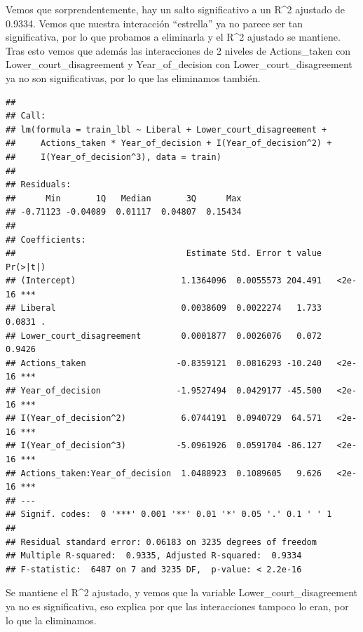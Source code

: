 \documentclass[
]{article}
\begin{document}
Vemos que sorprendentemente, hay un salto significativo a un R\^{}2
ajustado de 0.9334. Vemos que nuestra interacción ``estrella'' ya no
parece ser tan significativa, por lo que probamos a eliminarla y el
R\^{}2 ajustado se mantiene. Tras esto vemos que además las
interacciones de 2 niveles de Actions\_taken con
Lower\_court\_disagreement y Year\_of\_decision con
Lower\_court\_disagreement ya no son significativas, por lo que las
eliminamos también.

\begin{verbatim}
## 
## Call:
## lm(formula = train_lbl ~ Liberal + Lower_court_disagreement + 
##     Actions_taken * Year_of_decision + I(Year_of_decision^2) + 
##     I(Year_of_decision^3), data = train)
## 
## Residuals:
##      Min       1Q   Median       3Q      Max 
## -0.71123 -0.04089  0.01117  0.04807  0.15434 
## 
## Coefficients:
##                                  Estimate Std. Error t value Pr(>|t|)    
## (Intercept)                     1.1364096  0.0055573 204.491   <2e-16 ***
## Liberal                         0.0038609  0.0022274   1.733   0.0831 .  
## Lower_court_disagreement        0.0001877  0.0026076   0.072   0.9426    
## Actions_taken                  -0.8359121  0.0816293 -10.240   <2e-16 ***
## Year_of_decision               -1.9527494  0.0429177 -45.500   <2e-16 ***
## I(Year_of_decision^2)           6.0744191  0.0940729  64.571   <2e-16 ***
## I(Year_of_decision^3)          -5.0961926  0.0591704 -86.127   <2e-16 ***
## Actions_taken:Year_of_decision  1.0488923  0.1089605   9.626   <2e-16 ***
## ---
## Signif. codes:  0 '***' 0.001 '**' 0.01 '*' 0.05 '.' 0.1 ' ' 1
## 
## Residual standard error: 0.06183 on 3235 degrees of freedom
## Multiple R-squared:  0.9335, Adjusted R-squared:  0.9334 
## F-statistic:  6487 on 7 and 3235 DF,  p-value: < 2.2e-16
\end{verbatim}

Se mantiene el R\^{}2 ajustado, y vemos que la variable
Lower\_court\_disagreement ya no es significativa, eso explica por que
las interacciones tampoco lo eran, por lo que la eliminamos.
\end{document}
